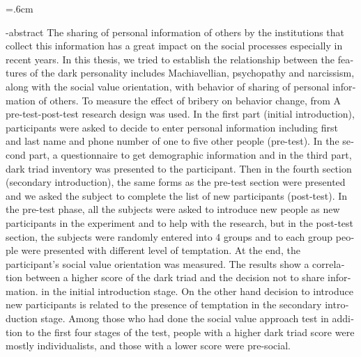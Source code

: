 
\baselineskip=.6cm
\begin{latin}
\en-abstract{
    The sharing of personal information of others by the institutions that collect this information has a great impact on the social processes
especially in recent years. In this thesis, we tried to establish the relationship between the features
of the dark personality includes Machiavellian, psychopathy and narcissism, along with the  social value orientation, with behavior
of sharing of personal information of others. To measure the effect of bribery on behavior change, from
A pre-test-post-test research design was used. In the first part (initial introduction), participants were asked to
decide to enter personal information including first and last name and phone number of one to five other people
(pre-test). In the second part, a questionnaire to get demographic information and in the third part, dark triad inventory was presented to the participant.
Then in the fourth section (secondary introduction), the same forms as the pre-test section were presented
and we asked the subject to complete the list of new participants (post-test). In the pre-test phase, all
the subjects were asked to introduce new people as new participants in the experiment and to help with the 
research, but in the post-test section, the subjects were randomly entered into 4 groups and to each group
people were presented with different level of temptation. At the end, the participant's social value orientation
was measured. The results show a correlation between a higher score of the dark triad and the decision not to share information.
in the initial introduction stage. On the other hand  decision to introduce new participants is related to the presence of temptation in the secondary introduction stage.
 Among those who had done the social value approach test in addition to the first four stages of the test, people with a higher dark triad score
were mostly individualists, and those with a lower score were pre-social.
}
\latinTitlePage
\end{latin}
